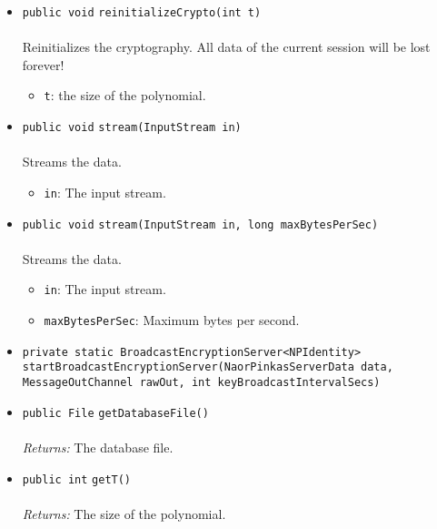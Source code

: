 \begin{itemize}
\item \lstinline|public void| \lstinline|reinitializeCrypto|\lstinline|(int t)|\\ \\[-0.6em]
Reinitializes the cryptography. 
 All data of the current session will be lost forever!
\begin{itemize}
\item \lstinline|t|: the size of the polynomial.
\end{itemize}



\item \lstinline|public void| \lstinline|stream|\lstinline|(InputStream in)|\\ \\[-0.6em]
Streams the data.
\begin{itemize}
\item \lstinline|in|: The input stream.
\end{itemize}



\item \lstinline|public void| \lstinline|stream|\lstinline|(InputStream in, long maxBytesPerSec)|\\ \\[-0.6em]
Streams the data.
\begin{itemize}
\item \lstinline|in|: The input stream.
\item \lstinline|maxBytesPerSec|: Maximum bytes per second.
\end{itemize}



\item \lstinline|private static BroadcastEncryptionServer<NPIdentity>| \lstinline|startBroadcastEncryptionServer|\lstinline|(NaorPinkasServerData data, MessageOutChannel rawOut, int keyBroadcastIntervalSecs)| \\[-0.6em]




\item \lstinline|public File| \lstinline|getDatabaseFile|\lstinline|()|\\ \\[-0.6em]
\emph{Returns:} The database file.



\item \lstinline|public int| \lstinline|getT|\lstinline|()|\\ \\[-0.6em]
\emph{Returns:} The size of the polynomial.




\end{itemize}

